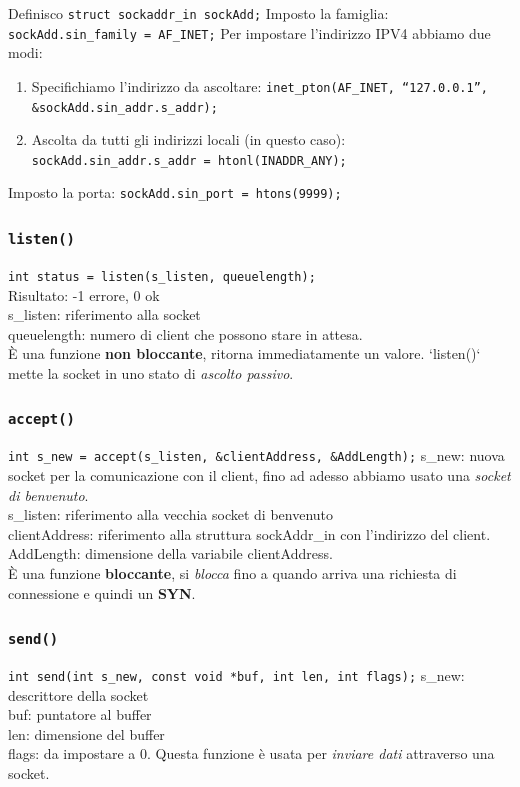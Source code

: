 Definisco \texttt{struct sockaddr\_in sockAdd;}
Imposto la famiglia: \texttt{sockAdd.sin\_family = AF\_INET;}
Per impostare l'indirizzo IPV4 abbiamo due modi:
\begin{enumerate}
  \item Specifichiamo l'indirizzo da ascoltare: \texttt{inet\_pton(AF\_INET, “127.0.0.1”, \&sockAdd.sin\_addr.s\_addr);}
  \item Ascolta da tutti gli indirizzi locali (in questo caso): \texttt{sockAdd.sin\_addr.s\_addr = htonl(INADDR\_ANY);}
\end{enumerate}
Imposto la porta: \texttt{sockAdd.sin\_port = htons(9999);}

\subsubsection*{\texttt{listen()}}
\texttt{int status = listen(s\_listen, queuelength);} \\
Risultato: -1 errore, 0 ok \\
s\_listen: riferimento alla socket \\
queuelength: numero di client che possono stare in attesa. \\
È una funzione \textbf{non bloccante}, ritorna immediatamente un valore. `listen()` mette la socket in uno stato di \textit{ascolto passivo}.

\subsubsection*{\texttt{accept()}}
\texttt{int s\_new = accept(s\_listen, \&clientAddress, \&AddLength);}
s\_new: nuova socket per la comunicazione con il client, fino ad adesso abbiamo usato una \textit{socket di benvenuto}. \\
s\_listen: riferimento alla vecchia socket di benvenuto \\
clientAddress: riferimento alla struttura sockAddr\_in con l'indirizzo del client. \\
AddLength: dimensione della variabile clientAddress. \\
È una funzione \textbf{bloccante}, si \textit{blocca} fino a quando arriva una richiesta di connessione e quindi un \textbf{SYN}.

\subsubsection*{\texttt{send()}}
\texttt{int send(int s\_new, const void *buf, int len, int flags);}
s\_new: descrittore della socket \\
buf: puntatore al buffer \\
len: dimensione del buffer \\
flags: da impostare a 0. Questa funzione è usata per \textit{inviare dati} attraverso una socket.

